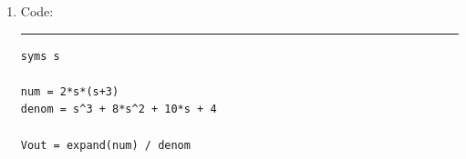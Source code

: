 \documentclass[11pt]{article}
\begin{document}
\begin{enumerate}[leftmargin=*,label=\textbf{\arabic*.}]
By the voltage divider,
\[V_\text{out}=I\cdot\frac{1\cdot0.5s}{1+0.5s}=\frac{2s(s+3)}{s^3+8s^2+10s+4}.\]

Find the roots of the expression in the denominator. Numerical approximation gives
\[s_1\approx-6.57,\quad s_2\approx-0.715+j0.313,\quad s_3\approx-0.715-j0.313=s_2^*.\]

Apply partial fraction decomposition.
\[\frac{2s(s+3)}{s^3+8s^2+10s+4}=\frac{A}{s+6.57}+\frac{B}{s+0.715+j0.313}+\frac{C}{s+0.715-j0.313}\]

Find the values $A, B$, and $C$.
\[A=\left.\frac{2s(s+3)}{(s+0.715+j0.313)(s+0.715-j0.313)}\right|_{s=-6.57}\approx1.364\]
\[B=\left.\frac{2s(s+3)}{(s+6.57)(s+0.715-j0.313)}\right|_{s=-0.715-j0.313}\approx0.318-j0.927\approx0.980\,\phase{-71.1^\circ}\]
\[C=\left.\frac{2s(s+3)}{(s+6.57)(s+0.715+j0.313)}\right|_{s=-0.715+j0.313}\approx0.318+j0.927\approx0.980\,\phase{71.1^\circ}\]

Using the inverse Laplace transform table, the solution is then
\[v_\text{out}(t)=\mathcal{L}^{-1}\left\{V_\text{out}(s)\right\}=\left[1.364e^{-6.57t}+1.96e^{0.715t}\cos(0.313t+71.1^\circ)\right]\cdot u(t).\]





\newpage

\item Code:

\vspace{1em}

\hrule
\begin{verbatim}
syms s

num = 2*s*(s+3)
denom = s^3 + 8*s^2 + 10*s + 4

Vout = expand(num) / denom


\end{verbatim}
\end{enumerate}
\end{document}
